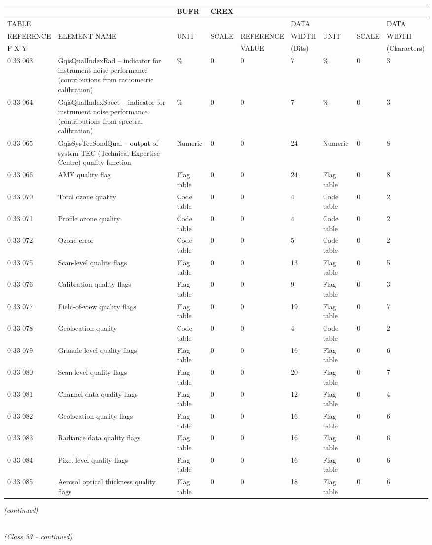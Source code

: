 \begin{longtable}[]{@{}lllllllll@{}}
\toprule
& & BUFR & CREX & & & & &\tabularnewline
\midrule
\endhead
TABLE & & & & & DATA & & & DATA\tabularnewline
REFERENCE & ELEMENT NAME & UNIT & SCALE & REFERENCE & WIDTH & UNIT & SCALE & WIDTH\tabularnewline
F X Y & & & & VALUE & (Bits) & & & (Characters)\tabularnewline
0 33 063 & GqisQualIndexRad -- indicator for instrument noise performance (contributions from radiometric calibration) & \% & 0 & 0 & 7 & \% & 0 & 3\tabularnewline
0 33 064 & GqisQualIndexSpect -- indicator for instrument noise performance (contributions from spectral calibration) & \% & 0 & 0 & 7 & \% & 0 & 3\tabularnewline
0 33 065 & GqisSysTecSondQual -- output of system TEC (Technical Expertise Centre) quality function & Numeric & 0 & 0 & 24 & Numeric & 0 & 8\tabularnewline
0 33 066 & AMV quality flag & Flag table & 0 & 0 & 24 & Flag table & 0 & 8\tabularnewline
0 33 070 & Total ozone quality & Code table & 0 & 0 & 4 & Code table & 0 & 2\tabularnewline
0 33 071 & Profile ozone quality & Code table & 0 & 0 & 4 & Code table & 0 & 2\tabularnewline
0 33 072 & Ozone error & Code table & 0 & 0 & 5 & Code table & 0 & 2\tabularnewline
0 33 075 & Scan-level quality flags & Flag table & 0 & 0 & 13 & Flag table & 0 & 5\tabularnewline
0 33 076 & Calibration quality flags & Flag table & 0 & 0 & 9 & Flag table & 0 & 3\tabularnewline
0 33 077 & Field-of-view quality flags & Flag table & 0 & 0 & 19 & Flag table & 0 & 7\tabularnewline
0 33 078 & Geolocation quality & Code table & 0 & 0 & 4 & Code table & 0 & 2\tabularnewline
0 33 079 & Granule level quality flags & Flag table & 0 & 0 & 16 & Flag table & 0 & 6\tabularnewline
0 33 080 & Scan level quality flags & Flag table & 0 & 0 & 20 & Flag table & 0 & 7\tabularnewline
0 33 081 & Channel data quality flags & Flag table & 0 & 0 & 12 & Flag table & 0 & 4\tabularnewline
0 33 082 & Geolocation quality flags & Flag table & 0 & 0 & 16 & Flag table & 0 & 6\tabularnewline
0 33 083 & Radiance data quality flags & Flag table & 0 & 0 & 16 & Flag table & 0 & 6\tabularnewline
0 33 084 & Pixel level quality flags & Flag table & 0 & 0 & 16 & Flag table & 0 & 6\tabularnewline
0 33 085 & Aerosol optical thickness quality flags & Flag table & 0 & 0 & 18 & Flag table & 0 & 6\tabularnewline
\bottomrule
\end{longtable}

\emph{(continued)}

\emph{\\
(Class 33 -- continued)}

